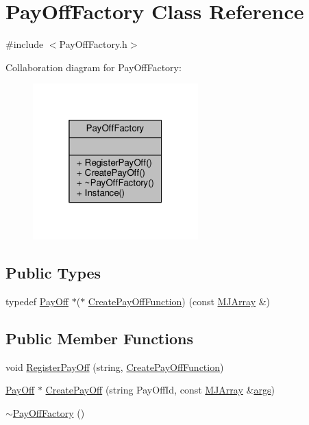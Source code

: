 \hypertarget{classPayOffFactory}{}\section{Pay\+Off\+Factory Class Reference}
\label{classPayOffFactory}


{\ttfamily \#include $<$Pay\+Off\+Factory.\+h$>$}



Collaboration diagram for Pay\+Off\+Factory\+:
\nopagebreak
\begin{figure}[H]
\begin{center}
\leavevmode
\includegraphics[width=181pt]{classPayOffFactory__coll__graph}
\end{center}
\end{figure}
\subsection*{Public Types}
\begin{DoxyCompactItemize}
\item 
typedef \hyperlink{classPayOff}{Pay\+Off} $\ast$($\ast$ \hyperlink{classPayOffFactory_ad2e3f0111b56ef662d95592074625e52}{Create\+Pay\+Off\+Function}) (const \hyperlink{classMJArray}{M\+J\+Array} \&)
\end{DoxyCompactItemize}
\subsection*{Public Member Functions}
\begin{DoxyCompactItemize}
\item 
void \hyperlink{classPayOffFactory_a0dc1f59f3a0c0bd1534bd80fc4ab87ee}{Register\+Pay\+Off} (string, \hyperlink{classPayOffFactory_ad2e3f0111b56ef662d95592074625e52}{Create\+Pay\+Off\+Function})
\item 
\hyperlink{classPayOff}{Pay\+Off} $\ast$ \hyperlink{classPayOffFactory_af0d9f45e311a22ccac37b3e79c9cb42a}{Create\+Pay\+Off} (string Pay\+Off\+Id, const \hyperlink{classMJArray}{M\+J\+Array} \&\hyperlink{path__generation_8h_a75c13cde2074f502cc4348c70528572d}{args})
\item 
\hyperlink{classPayOffFactory_a8324350697d8ce559faa232f6b09c47c}{$\sim$\+Pay\+Off\+Factory} ()
\end{DoxyCompactItemize}
